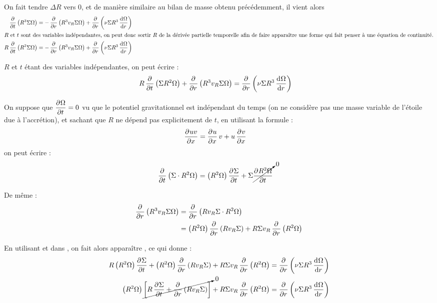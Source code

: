 On fait tendre $\Delta R$ vers 0, et de manière similaire au bilan de masse obtenu précédemment, il vient alors 
\begin{align*}
\dpd{}{t}\left(R^3 \Sigma\Omega\right) &= -\dpd{}{r}\left(R^3 v_R \Sigma \Omega\right) + \dpd{}{r}\left(\nu \Sigma R^3 \dod{\Omega}{r}\right)\\
\intertext{$R$ et $t$ sont des variables indépendantes, on peut donc sortir $R$ de la dérivée partielle temporelle afin de faire apparaître une forme qui fait penser à une équation de continuité.}
R\dpd{}{t}\left(R^2 \Sigma\Omega\right) &= -\dpd{}{r}\left(R^3 v_R \Sigma \Omega\right) + \dpd{}{r}\left(\nu \Sigma R^3 \dod{\Omega}{r}\right)
\end{align*}

$R$ et $t$ étant des variables indépendantes, on peut écrire :
\begin{align}
R\dpd{}{t}\left(\Sigma R^2\Omega\right) + \dpd{}{r}\left(R^3 v_R \Sigma \Omega\right) &= \dpd{}{r}\left(\nu \Sigma R^3 \dod{\Omega}{r}\right)\label{eq:ang_mom_01}
\end{align}

\bigskip

On suppose que $\dpd{\Omega}{t}=0$ vu que le potentiel gravitationnel est indépendant du temps (on ne considère pas une masse variable de l'étoile due à l'accrétion), et sachant que $R$ ne dépend pas explicitement de $t$, en utilisant la formule : 
\begin{align*}
\dpd{uv}{x} &= \dpd{u}{x}v + u\dpd{v}{x}
\end{align*}
on peut écrire :
\begin{align}
\dpd{}{t}\left(\Sigma\cdot R^2\Omega\right) &= \left(R^2\Omega\right)\dpd{\Sigma}{t} + \Sigma\cancelto{0}{\dpd{R^2\Omega}{t}}\label{eq:ang_mom_tmp_01}
\end{align}

De même : 
\begin{align}
\dpd{}{r}\left(R^3 v_R \Sigma \Omega\right) &= \dpd{}{r}\left(R v_R \Sigma \cdot R^2\Omega\right)\nonumber\\
&= \left(R^2\Omega\right)\dpd{}{r}\left(R v_R \Sigma\right) + R \Sigma v_R \dpd{}{r}\left(R^2\Omega\right)\label{eq:ang_mom_tmp_02}
\end{align}

En utilisant  et  dans , on fait alors apparaître , ce qui donne : 
\begin{align*}
R\left(R^2\Omega\right)\dpd{\Sigma}{t} + \left(R^2\Omega\right)\dpd{}{r}\left(R v_R \Sigma\right) + R \Sigma v_R \dpd{}{r}\left(R^2\Omega\right) &= \dpd{}{r}\left(\nu \Sigma R^3 \dod{\Omega}{r}\right)\\
\left(R^2\Omega\right)\cancelto{0}{\left[R\dpd{\Sigma}{t} + \dpd{}{r}\left(R v_R \Sigma\right)\right]} + R \Sigma v_R \dpd{}{r}\left(R^2\Omega\right) &= \dpd{}{r}\left(\nu \Sigma R^3 \dod{\Omega}{r}\right)
\end{align*}

